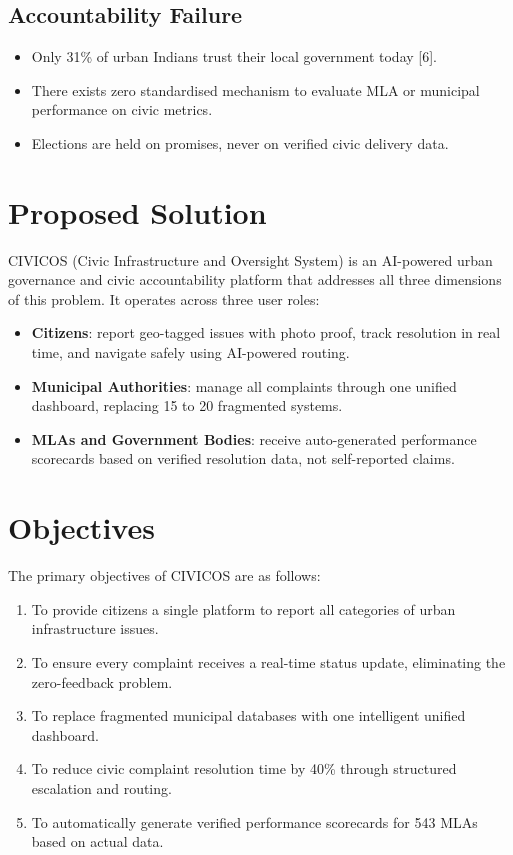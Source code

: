 \documentclass[12pt,a4paper]{report}
\begin{document}
\subsection{Accountability Failure}

\begin{itemize}
    \item Only 31\% of urban Indians trust their local government today
    [6].
    \item There exists zero standardised mechanism to evaluate MLA or municipal
    performance on civic metrics.
    \item Elections are held on promises, never on verified civic delivery data.
\end{itemize}

\section{Proposed Solution}

CIVICOS (Civic Infrastructure and Oversight System) is an AI-powered urban
governance and civic accountability platform that addresses all three dimensions
of this problem. It operates across three user roles:

\begin{itemize}
    \item \textbf{Citizens}: report geo-tagged issues with photo proof, track
    resolution in real time, and navigate safely using AI-powered routing.
    \item \textbf{Municipal Authorities}: manage all complaints through one
    unified dashboard, replacing 15 to 20 fragmented systems.
    \item \textbf{MLAs and Government Bodies}: receive auto-generated
    performance scorecards based on verified resolution data, not self-reported
    claims.
\end{itemize}

\section{Objectives}

The primary objectives of CIVICOS are as follows:

\begin{enumerate}
    \item To provide citizens a single platform to report all categories of
    urban infrastructure issues.
    \item To ensure every complaint receives a real-time status update,
    eliminating the zero-feedback problem.
    \item To replace fragmented municipal databases with one intelligent unified
    dashboard.
    \item To reduce civic complaint resolution time by 40\% through structured
    escalation and routing.
    \item To automatically generate verified performance scorecards for 543 MLAs
    based on actual data.
\end{enumerate}
\end{document}
